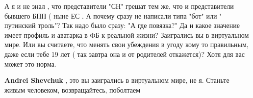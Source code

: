 \begin{itemize}
\begin{itemize}
 

А я и не знал , что представители "СН" грешат тем же, что и представители
бывшего БПП ( ныне ЕС \Laughey[1.0][white]\Laughey[1.0][white]\Laughey[1.0][white]. А почему сразу не написали типа "бот" или "
путинский троль"? Так надо было сразу: "А где повязка?" Да и какое значение
имеет профиль и аватарка в ФБ к реальной жизни? Заигрались вы в виртуальном
мире. Или вы считаете, что менять свои убеждения в угоду кому то правильным,
даже если тебе 19 лет ( так завтра она и от родителей откажется)? Хотя для вас
может это норма.


 
\textbf{Andrei Shevchuk} , это вы заигрались в виртуальном мире, не я.
Станьте живым человеком, возвращайтесь, поболтаем
\end{itemize}


\end{itemize}

